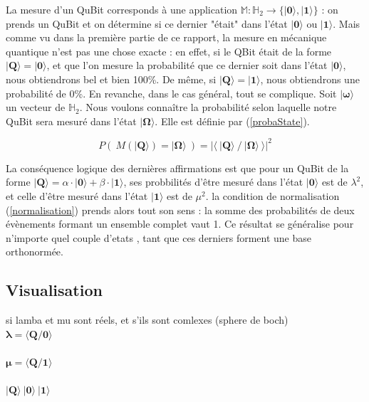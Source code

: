 \documentclass[a4paper,12pt]{report}
\newcommand{\prodSc}[2]{\langle #1 / #2 \rangle}
\newcommand{\quSt}[1]{\bm{|#1\rangle}}
\begin{document}
\par{
	La mesure d'un QuBit corresponds à une application $\mathbb{M} : \mathbb{H}_{2} \rightarrow \{ \quSt{0}, \quSt{1} \}$ : on prends un QuBit et on détermine si ce dernier "était" dans l'état $\quSt{0}$ ou $\quSt{1}$. Mais comme vu dans la première partie de ce rapport, la mesure en mécanique quantique n'est pas une chose exacte : en effet, si le QBit était de la forme $\quSt{Q} = \quSt{0}$, et que l'on mesure la probabilité que ce dernier soit dans l'état $\quSt{0}$, nous obtiendrons bel et bien 100\%. De même, si $\quSt{Q} = \quSt{1}$, nous obtiendrons une probabilité de 0\%. En revanche, dans le cas général, tout se complique. Soit $\quSt{\omega}$ un vecteur de $\mathbb{H}_{2}$. Nous voulons connaître la probabilité selon laquelle notre QuBit sera mesuré dans l'état $\quSt{\Omega}$. Elle est définie par (\ref{probaState}).
}

\begin{equation} \label{probaState}
	P(~ M( \quSt{Q} ) = \quSt{\Omega} ~) = | \langle ~ \quSt{Q} ~/~  \quSt{\Omega} ~\rangle |^2
\end{equation}

\vspace{1\baselineskip}

\par{
	La conséquence logique des dernières affirmations est que pour un QuBit de la forme $\quSt{Q} = \alpha \cdot \quSt{0} + \beta \cdot \quSt{1}$, ses probbilités d'être mesuré dans l'état $\quSt{0}$ est de $\lambda^2$, et celle d'être mesuré dans l'état $\quSt{1}$ est de $\mu^2$. la condition de normalisation (\ref{normalisation}) prends alors tout son sens : la somme des probabilités de deux évènements formant un ensemble complet vaut 1. Ce résultat se généralise pour n'importe quel couple d'etats , tant que ces derniers forment une base orthonormée.
}

		\subsection{Visualisation}

\par{
	si lamba et mu sont réels, et s'ils sont comlexes (sphere de boch)\\
	$\bm{\lambda = \prodSc{Q}{0} }$ \\ \\ $\bm{\mu = \prodSc{Q}{1}}$ \\ \\ $\bm{\quSt{Q}~\quSt{0}~\quSt{1}}$
}
\end{document}

